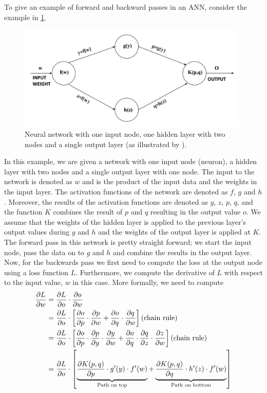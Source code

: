 To give an example of forward and backward passes in an ANN, consider the example in \cref{fig:neural-network-example-backprop}.
\begin{figure}[H]
    \centering
    \includegraphics[width=11cm]{thesis/figures/neural-network-example-backprop-aggarwal-2018.png}
    \caption{Neural network with one input node, one hidden layer with two nodes and a single output layer (as illustrated by \cite[Figure 1.13]{Aggarwal18}).}
    \label{fig:neural-network-example-backprop}
\end{figure}

In this example, we are given a network with one input node (neuron), a hidden layer with two nodes and a single output layer with one node. The input to the network is denoted as $w$ and is the product of the input data and the weights in the input layer. The activation functions of the network are denoted as $f$, $g$ and $h$. Moreover, the results of the activation functions are denoted as $y$, $z$, $p$, $q$, and the function $K$ combines the result of $p$ and $q$ resulting in the output value $o$. We assume that the weights of the hidden layer is applied to the previous layer's output values during $g$ and $h$ and the weights of the output layer is applied at $K$. The forward pass in this network is pretty straight forward; we start the input node, pass the data on to $g$ and $h$ and combine the results in the output layer. Now, for the backwards pass we first need to compute the loss at the output node using a loss function $L$. Furthermore, we compute the derivative of $L$ with respect to the input value, $w$ in this case. More formally, we need to compute
\begin{align}
    \parder{L}{w}
    &= \parder{L}{o} \cdot \parder{o}{w} \\
    &= \parder{L}{o} \cdot \left[
    \parder{o}{p} \cdot \parder{p}{w} +
    \parder{o}{q} \cdot \parder{q}{w}
    \right] \text{(chain rule)} \\
    &= \parder{L}{o} \cdot \left[
    \parder{o}{p} \cdot \parder{p}{y} \cdot \parder{y}{w} + 
    \parder{o}{q} \cdot \parder{q}{z} \cdot \parder{z}{w}
    \right] \text{(chain rule)} \\
    &= \parder{L}{o} \cdot \left[
    \undertext{\parder{K(p, q)}{p} \cdot g'(y) \cdot f'(w)}{Path on top} + 
    \undertext{\parder{K(p, q)}{q} \cdot h'(z) \cdot f'(w)}{Path on bottom}
    \right]
\end{align}

